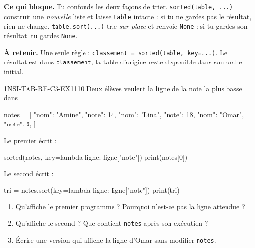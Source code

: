 

\textbf{Ce qui bloque.} Tu confonds les deux façons de trier. \lstinline{sorted(table, ...)}
construit une \emph{nouvelle} liste et laisse \lstinline{table} intacte : si tu ne gardes
pas le résultat, rien ne change. \lstinline{table.sort(...)} trie \emph{sur place} et
renvoie \lstinline{None} : si tu gardes son résultat, tu gardes \lstinline{None}.

\textbf{À retenir.} Une seule règle : \lstinline{classement = sorted(table, key=...)}. Le
résultat est dans \lstinline{classement}, la table d'origine reste disponible dans son ordre
initial.

\begin{exercice}{1NSI-TAB-RE-C3-EX1}{1}{10}
Deux élèves veulent la ligne de la note la plus basse dans
\begin{python}
notes = [
    {"nom": "Amine", "note": 14},
    {"nom": "Lina", "note": 18},
    {"nom": "Omar", "note": 9},
]
\end{python}
Le premier écrit :
\begin{python}
sorted(notes, key=lambda ligne: ligne["note"])
print(notes[0])
\end{python}
Le second écrit :
\begin{python}
tri = notes.sort(key=lambda ligne: ligne["note"])
print(tri)
\end{python}
\begin{enumerate}
  \item Qu'affiche le premier programme ? Pourquoi n'est-ce pas la ligne attendue ?
  \item Qu'affiche le second ? Que contient \lstinline{notes} après son exécution ?
  \item Écrire une version qui affiche la ligne d'Omar sans modifier \lstinline{notes}.
\end{enumerate}
\end{exercice}

